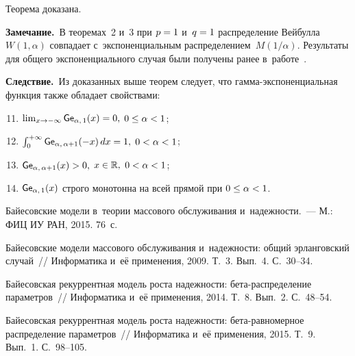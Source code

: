 \begin{multicols}{2}
Теорема доказана.

\smallskip

\noindent
\textbf{Замечание.}\ В теоремах~2 и~3 при $p\hm = 1$ и~$q \hm= 1$ распределение 
Вейбулла $W(1, \alpha)$ совпадает с~экспоненциальным распределением~$M(1/\alpha)$. 
Результаты для общего экспоненциального случая были получены 
ранее в~работе~\cite{KuSh09b}.

\smallskip

\noindent
\textbf{Следствие.}\
Из доказанных выше теорем следует, что гам\-ма-экс\-по\-нен\-ци\-аль\-ная
 функция также обладает свойствами:
\begin{enumerate}
\setcounter{enumi}{10}
\item $\lim\nolimits_{x\to-\infty} \G_{\alpha,\, 1}(x) \hm= 0,$ $0\hm\leq \alpha\hm<1$;
\item $\int\nolimits_{0}^{+\infty} \G_{\alpha,\, \alpha + 1}(-x)\,dx \hm= 1,$ $0\hm<\alpha\hm<1$;
\item $\G_{\alpha,\, \alpha + 1}(x)\hm > 0,$ $x\hm\in\mathbb{R},$ $0\hm<\alpha\hm<1$;
\item ${\sf Ge}_{\alpha,\, 1}(x)$ строго монотонна на всей прямой при $0\hm\le\alpha\hm<1$.
\end{enumerate}





{\small\frenchspacing
 {%
 \begin{thebibliography}{9}

Байесовские модели в~тео\-рии массового обслуживания и~надежности.~--- 
М.: ФИЦ ИУ РАН, 2015. 76~с.

 Байе\-сов\-ские
модели массового обслуживания и~надежности: общий эрланговский
случай~// Информатика и~её применения, 2009. Т.~3. Вып.~4. С.~30--34.

Байесовская рекуррентная модель роста надежности: бе\-та-рас\-пре\-де\-ле\-ние
параметров~// Информатика и~её применения, 2014. Т.~8. Вып.~2.
С.~48--54.

Байесовская рекуррентная модель роста надежности: бета-рав\-но\-мер\-ное
распределение параметров~// Информатика и~её применения, 2015. Т.~9.
Вып.~1. С.~98--105.


\end{thebibliography}}}
\end{multicols}
